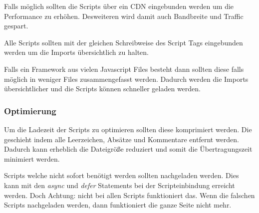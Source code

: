 Falls möglich sollten die Scripts über ein CDN eingebunden werden um die Performance zu erhöhen. Desweiteren wird damit auch Bandbreite und Traffic gespart. 

Alle Scripts sollten mit der gleichen Schreibweise des Script Tags eingebunden werden um die Imports übersichtlich zu halten. 

Falls ein Framework aus vielen Javascript Files besteht dann sollten diese falls möglich in weniger Files zusammengefasst werden. Dadurch werden die Imports übersichtlicher und die Scripts können schneller geladen werden.

\subsubsection{Optimierung}
Um die Ladezeit der Scripts zu optimieren sollten diese komprimiert werden. Die geschieht indem alle Leerzeichen, Absätze und Kommentare entfernt werden. Dadurch kann erheblich die Dateigröße reduziert und somit die Übertragungszeit minimiert werden. 

Scripts welche nicht sofort benötigt werden sollten nachgeladen werden. Dies kann mit den \textit{async} und \textit{defer} Statements bei der Scripteinbindung erreicht werden. Doch Achtung: nicht bei allen Scripts funktioniert das. Wenn die falschen Scripts nachgeladen werden, dann funktioniert die ganze Seite nicht mehr.